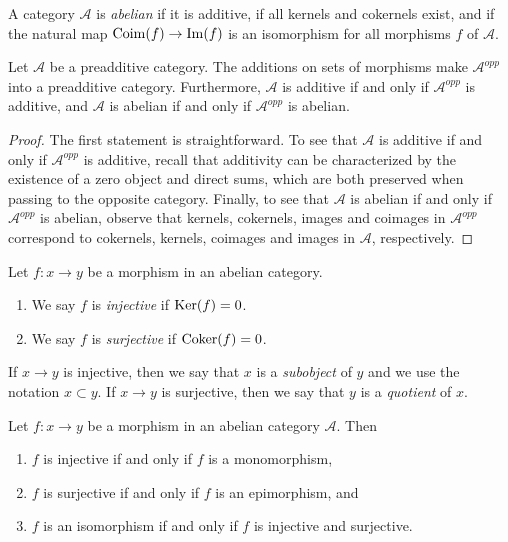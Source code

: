 \begin{definition}
\label{definition-abelian-category}
A category $\mathcal{A}$ is {\it abelian} if
it is additive, if all kernels and cokernels exist,
and if the natural map $\mathop{\mathrm{Coim}}(f) \to \mathop{\mathrm{Im}}(f)$
is an isomorphism for all morphisms $f$ of
$\mathcal{A}$.
\end{definition}

\begin{lemma}
\label{lemma-abelian-opposite}
Let $\mathcal{A}$ be a preadditive category.
The additions on sets of morphisms make
$\mathcal{A}^{opp}$ into a preadditive category.
Furthermore, $\mathcal{A}$ is additive if and only if $\mathcal{A}^{opp}$
is additive, and
$\mathcal{A}$ is abelian if and only if $\mathcal{A}^{opp}$ is abelian.
\end{lemma}

\begin{proof}
The first statement is straightforward.
To see that $\mathcal{A}$ is additive if and only if $\mathcal{A}^{opp}$
is additive, recall that additivity can be characterized by
the existence of a zero object and direct sums, which are both
preserved when passing to the opposite category.
Finally, to see that
$\mathcal{A}$ is abelian if and only if $\mathcal{A}^{opp}$ is abelian,
observe that kernels, cokernels, images and coimages in
$\mathcal{A}^{opp}$ correspond to
cokernels, kernels, coimages and images in $\mathcal{A}$,
respectively.
\end{proof}

\begin{definition}
\label{definition-injective-surjective}
Let $f : x \to y$ be a morphism in an abelian category.
\begin{enumerate}
\item We say $f$ is {\it injective} if $\mathop{\mathrm{Ker}}(f) = 0$.
\item We say $f$ is {\it surjective} if $\mathop{\mathrm{Coker}}(f) = 0$.
\end{enumerate}
If $x \to y$ is injective, then we say that $x$ is a {\it subobject}
of $y$ and we use the notation $x \subset y$. If $x \to y$ is
surjective, then we say that $y$ is a {\it quotient} of $x$.
\end{definition}

\begin{lemma}
\label{lemma-characterize-injective}
Let $f : x \to y$ be a morphism in an abelian category $\mathcal{A}$. Then
\begin{enumerate}
\item $f$ is injective if and only if $f$ is a monomorphism,
\item $f$ is surjective if and only if $f$ is an epimorphism, and
\item $f$ is an isomorphism if and only if $f$ is injective and surjective.
\end{enumerate}
\end{lemma}

